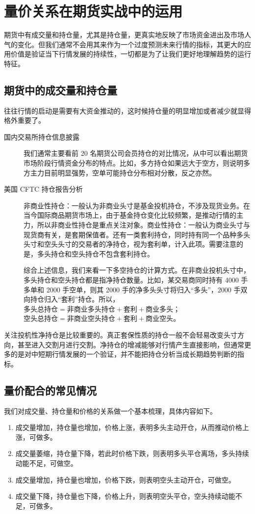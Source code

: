\chapter{量价关系在期货实战中的运用}
期货中有成交量和持仓量，尤其是持仓量，更真实地反映了市场资金进出及市场人气的变化。但我们通常不会用其来作为一个过度预测未来行情的指标，其更大的应用价值是验证当下行情发展的持续性，一切都是为了让我们更好地理解趋势的运行特征。
\section{期货中的成交量和持仓量}
往往行情的启动是需要有大资金推动的，这时候持仓量的明显增加或者减少就显得格外重要了。

\begin{description}
    \item[国内交易所持仓信息披露]我们通常主要看前 20 名期货公司会员持仓的对比情况，从中可以看出期货市场阶段行情资金分布的特点。比如，多方持仓如果远大于空方，则说明多方主力目前明显强势，空单可能持仓分布相对分散，反之亦然。
    \item[美国 CFTC 持仓报告分析]非商业性持仓：一般认为非商业头寸是基金投机持仓，不涉及现货业务。在当今国际商品期货市场上，由于基金持仓变化比较频繁，是推动行情的主力，所以非商业性持仓是重点关注对象。商业性持仓：一般认为商业头寸与现货商有关，是套期保值者。还有一类套利持仓，同时持有同一个品种多头头寸和空头头寸的交易者的净持仓，视为套利单，计入此项。需要注意的是，多头持仓和空头持仓不包含套利持仓。

    综合上述信息，我们来看一下多空持仓的计算方式。在非商业投机头寸中，多头持仓和空头持仓都是指净持仓数量。比如，某交易商同时持有 4000 手多单和 2000 手空单，则其 2000 手的净多头头寸将归入“多头”，2000 手双向持仓归入“套利”持仓。所以，$\text{多头总持仓}=\text{非商业多头持仓}+\text{套利}+\text{商业多头}$；$\text{空头总持仓}=\text{非商业空头持仓}+\text{套利}+\text{商业空头}$。
\end{description}

关注投机性净持仓是比较重要的。真正套保性质的持仓一般不会轻易改变头寸方向，甚至进入交割月进行交割。净持仓的增减能够对行情产生直接影响，但通常更多的是对中短期行情发展的一个验证，并不能把持仓分析当成长期趋势判断的指标。

\section{量价配合的常见情况}
我们对成交量、持仓量和价格的关系做一个基本梳理，具体内容如下。
\begin{enumerate}
    \item 成交量增加，持仓量也增加，价格上涨，表明多头主动开仓，从而推动价格上涨，可做多。
    \item 成交量萎缩，持仓量下降，若此时价格下跌，则表明多头平仓离场，多头持续动能不足，可做空。
    \item 成交量增加，持仓量也增加，价格下跌，则表明空头主动开仓，可做空。
    \item 成交量下降，持仓量也下降，价格上升，则表明空头平仓，空头持续动能不足，可做多。
\end{enumerate}

